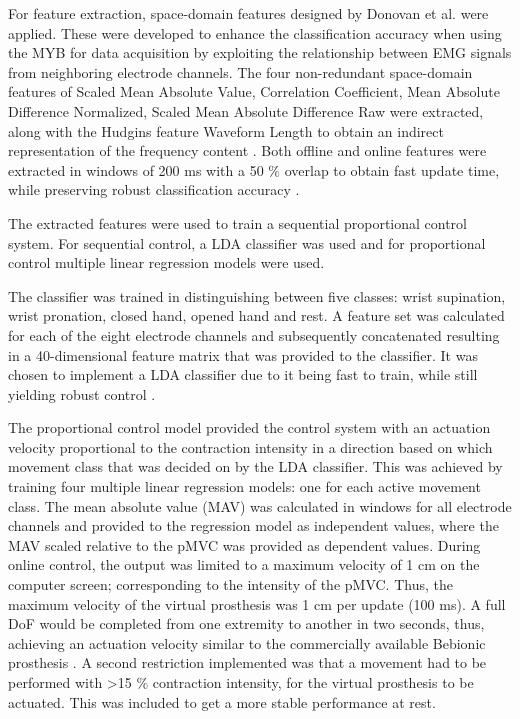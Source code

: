 For feature extraction, space-domain features designed by Donovan et al. \cite{Donovan2017} were applied. These were developed to enhance the classification accuracy when using the MYB for data acquisition by exploiting the relationship between EMG signals from neighboring electrode channels. The four non-redundant space-domain features of Scaled Mean Absolute Value, Correlation Coefficient, Mean Absolute Difference Normalized, Scaled Mean Absolute Difference Raw were extracted, along with the Hudgins feature Waveform Length to obtain an indirect representation of the frequency content \cite{Hudgins1993}. Both offline and online features were extracted in windows of 200 ms with a 50 $\%$ overlap to obtain fast update time, while preserving robust classification accuracy \cite{Menon2017}.

The extracted features were used to train a sequential proportional control system. For sequential control, a LDA classifier was used and for proportional control multiple linear regression models were used.

The classifier was trained in distinguishing between five classes: wrist supination, wrist pronation, closed hand, opened hand and rest. A feature set was calculated for each of the eight electrode channels and subsequently concatenated resulting in a 40-dimensional feature matrix that was provided to the classifier. It was chosen to implement a LDA classifier due to it being fast to train, while still yielding robust control \cite{Englehart2003}.  

The proportional control model provided the control system with an actuation velocity proportional to the contraction intensity in a direction based on which movement class that was decided on by the LDA classifier. This was achieved by training four multiple linear regression models: one for each active movement class. The mean absolute value (MAV) was calculated in windows for all electrode channels and provided to the regression model as independent values, where the MAV scaled relative to the pMVC was provided as dependent values. During online control, the output was limited to a maximum velocity of 1 cm on the computer screen; corresponding to the intensity of the pMVC. Thus, the maximum velocity of the virtual prosthesis was 1 cm per update (100 ms). A full DoF would be completed from one extremity to another in two seconds, thus, achieving an actuation velocity similar to the commercially available Bebionic prosthesis \cite{Belter2013}. A second restriction implemented was that a movement had to be performed with >15 $\%$ contraction intensity, for the virtual prosthesis to be actuated. This was included to get a more stable performance at rest. 